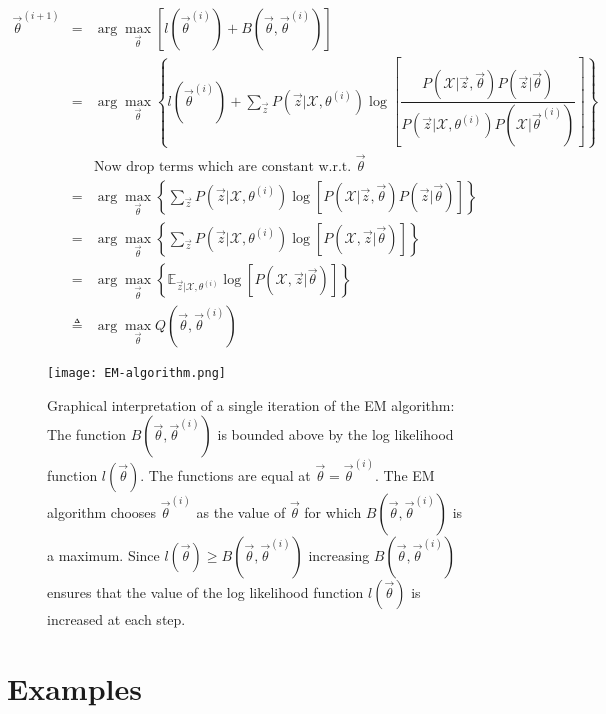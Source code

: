 \begin{eqnarray}
\vec{\theta}^{(i+1)} &=& \arg\max\limits_{\vec{\theta}}{\left[ l(\vec{\theta}^{(i)})+B(\vec{\theta},\vec{\theta}^{(i)})\right]} \nonumber \\
                &=& \arg\max\limits_{\vec{\theta}}{\left\{ l(\vec{\theta}^{(i)})+\sum\limits_{\vec{z}} P(\vec{z}|\mathcal{X},\theta^{(i)})\log\left[\dfrac{P(\mathcal{X}|\vec{z},\vec{\theta})P(\vec{z}|\vec{\theta})}{P(\vec{z}|\mathcal{X},\theta^{(i)})P(\mathcal{X}|\vec{\theta}^{(i)})}\right]\right\}} \nonumber \\
				&& \text{Now drop terms which are constant w.r.t. } \vec{\theta} \nonumber \\
				&=& \arg\max\limits_{\vec{\theta}}{\left\{\sum\limits_{\vec{z}} P(\vec{z}|\mathcal{X},\theta^{(i)})\log\left[P(\mathcal{X}|\vec{z},\vec{\theta})P(\vec{z}|\vec{\theta})\right]\right\}} \nonumber \\
				&=& \arg\max\limits_{\vec{\theta}}{\left\{\sum\limits_{\vec{z}} P(\vec{z}|\mathcal{X},\theta^{(i)})\log\left[P(\mathcal{X},\vec{z}|\vec{\theta})\right]\right\}} \nonumber \\
				&=& \arg\max\limits_{\vec{\theta}}{\left\{\mathbb{E}_{\vec{z}|\mathcal{X},\theta^{(i)}}\log\left[P(\mathcal{X},\vec{z}|\vec{\theta})\right]\right\}} \\
				&\triangleq& \arg\max\limits_{\vec{\theta}}{Q(\vec{\theta}, \vec{\theta}^{(i)})}
\end{eqnarray}

\begin{figure}[hbtp]
\centering
    \texttt{[image: EM-algorithm.png]}
\caption{Graphical interpretation of a single iteration of the EM algorithm: The function $B(\vec{\theta},\vec{\theta}^{(i)})$ is bounded above by the log likelihood function $l(\vec{\theta})$. The functions are equal at $\vec{\theta} = \vec{\theta}^{(i)}$. The EM algorithm chooses $\vec{\theta}^{(i)}$ as the value of $\vec{\theta}$ for which $B(\vec{\theta},\vec{\theta}^{(i)})$ is a maximum. Since $l(\vec{\theta}) \geq B(\vec{\theta},\vec{\theta}^{(i)})$ increasing $B(\vec{\theta},\vec{\theta}^{(i)})$ ensures that the value of the log likelihood function $l(\vec{\theta})$ is increased at each step.}
\label{fig:EM-algorithm} 
\end{figure}


\section{Examples}

